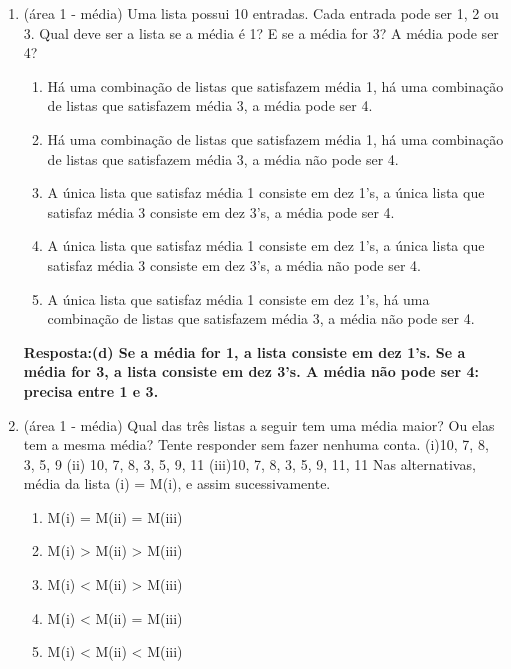 \documentclass[12pt]{article}\documentclass[brazilian,12pt,a4paper,final]{article}
\begin{document}
\begin{enumerate}
\begin{enumerate}[label=(\alph*)]
\item Antes do ponto 3, depois do ponto 5, antes do primeiro ponto.

\item No meio dos pontos 3 e 5, no meio dos pontos 3 e 5, depois do segundo ponto.

\end{enumerate}

\textbf{Respostas:(c)(I) 4 (II) 4,3 (III) No meio dos 2 pontos.}


\item (área 1 - média) Uma lista possui 10 entradas. Cada entrada pode ser 1, 2 ou 3. Qual deve ser a lista se a
média é 1? E se a média for 3? A média pode ser 4?

\begin{enumerate}
    \item Há uma combinação de listas que satisfazem média 1, há uma combinação de listas que satisfazem média 3, a média pode ser 4.
    \item Há uma combinação de listas que satisfazem média 1, há uma combinação de listas que satisfazem média 3, a média não pode ser 4.
    \item A única lista que satisfaz média 1 consiste em dez 1's, a única lista que satisfaz média 3 consiste em dez 3's, a média pode ser 4.
    \item A única lista que satisfaz média 1 consiste em dez 1's, a única lista que satisfaz média 3 consiste em dez 3's, a média não pode ser 4.
    \item A única lista que satisfaz média 1 consiste em dez 1's, há uma combinação de listas que satisfazem média 3, a média não pode ser 4.
    
\end{enumerate}

\textbf{Resposta:(d) Se a média for 1, a lista consiste em dez 1's. Se a média for 3, a lista consiste em dez 3's. A média não pode ser 4: precisa entre 1 e 3.
}

\item (área 1 - média) Qual das três listas a seguir tem uma média maior? Ou elas tem a mesma média? Tente responder sem fazer nenhuma conta.
(i)10, 7, 8, 3, 5, 9 \hspace{0,8cm} (ii) 10, 7, 8, 3, 5, 9, 11 \hspace{0,8cm} (iii)10, 7, 8, 3, 5, 9, 11, 11
Nas alternativas, média da lista (i) = M(i), e assim sucessivamente.
\begin{enumerate}
    \item M(i) = M(ii) = M(iii)
    \item M(i) > M(ii) > M(iii)
    \item M(i) < M(ii) > M(iii)
    \item M(i) < M(ii) = M(iii)
    \item M(i) < M(ii) < M(iii)
\end{enumerate}



\end{enumerate}
\end{document}
